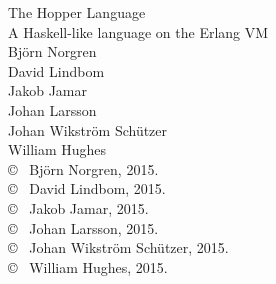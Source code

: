 %	
%	


\newpage
\thispagestyle{plain}
\vspace*{4.5cm}
The Hopper Language\\
A Haskell-like language on the Erlang VM\\
Björn Norgren\\
David Lindbom\\
Jakob Jamar\\
Johan Larsson\\
Johan Wikström Schützer\\
William Hughes\\[0.5cm]

\copyright ~ Björn Norgren, 2015.\\
\copyright ~ David Lindbom, 2015.\\
\copyright ~ Jakob Jamar, 2015.\\
\copyright ~ Johan Larsson, 2015.\\
\copyright ~ Johan Wikström Schützer, 2015.\\
\copyright ~ William Hughes, 2015.\\[0.5cm]

